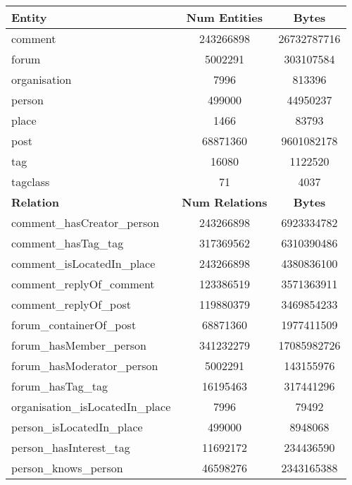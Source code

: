 \begin{table}[H]
    \centering
    \begin{tabular} {| l | c | c |}
        \hline
        \textbf{Entity} & \textbf{Num Entities} & \textbf{Bytes} \\
        \hline
        \hline
        comment & 243266898 & 26732787716 \\
        \hline
        forum & 5002291 & 303107584 \\
        \hline
        organisation & 7996 & 813396 \\
        \hline
        person & 499000 & 44950237 \\
        \hline
        place & 1466 & 83793 \\
        \hline
        post & 68871360 & 9601082178 \\
        \hline
        tag & 16080 & 1122520 \\
        \hline
        tagclass & 71 & 4037 \\
        \hline
        \hline
        \textbf{Relation} & \textbf{Num Relations} & \textbf{Bytes} \\
        \hline
        \hline
        comment\_hasCreator\_person & 243266898 & 6923334782 \\
        \hline
        comment\_hasTag\_tag & 317369562 & 6310390486 \\
        \hline
        comment\_isLocatedIn\_place & 243266898 & 4380836100 \\
        \hline
        comment\_replyOf\_comment & 123386519 & 3571363911 \\
        \hline
        comment\_replyOf\_post & 119880379 & 3469854233 \\
        \hline
        forum\_containerOf\_post & 68871360 & 1977411509 \\
        \hline
        forum\_hasMember\_person & 341232279 & 17085982726 \\
        \hline
        forum\_hasModerator\_person & 5002291 & 143155976 \\
        \hline
        forum\_hasTag\_tag & 16195463 & 317441296 \\
        \hline
        organisation\_isLocatedIn\_place & 7996 & 79492 \\
        \hline
        person\_isLocatedIn\_place & 499000 & 8948068 \\
        \hline
        person\_hasInterest\_tag & 11692172 & 234436590 \\
        \hline
        person\_knows\_person & 46598276 & 2343165388 \\

\end{tabular}
\end{table}
